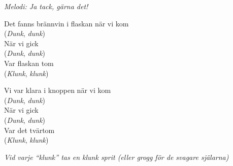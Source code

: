 {\footnotesize\textit{Melodi: Ja tack, gärna det!}}\par
\vspace{10pt}
Det fanns brännvin i flaskan när vi kom\\
(\textit{Dunk}, \textit{dunk})\\
När vi gick\\
(\textit{Dunk}, \textit{dunk})\\
Var flaskan tom\\
(\textit{Klunk}, \textit{klunk})\par
\vspace{10pt}
Vi var klara i knoppen när vi kom\\
(\textit{Dunk}, \textit{dunk})\\
När vi gick\\
(\textit{Dunk}, \textit{dunk})\\
Var det tvärtom\\
(\textit{Klunk}, \textit{klunk})\par
\vspace{10pt}
{\footnotesize\textit{Vid varje ``klunk'' tas en klunk sprit (eller grogg för de svagare själarna)}}

